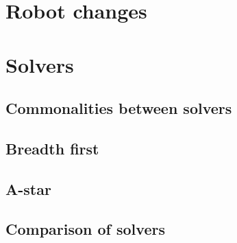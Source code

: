 \documentclass[../../main.tex]{subfiles}
\begin{document}
\section{Robot changes}
\label{sub:robot changes}


\section{Solvers}
\label{sub:solvers}


\subsection{Commonalities between solvers}%
\label{sub:commonalities}


\subsection{Breadth first}%
\label{sub:breadth_first}




\subsection{A-star}%
\label{sub:a_star}



\subsection{Comparison of solvers}%
\label{sub:comparison_of_solvers}




	
\end{document}
